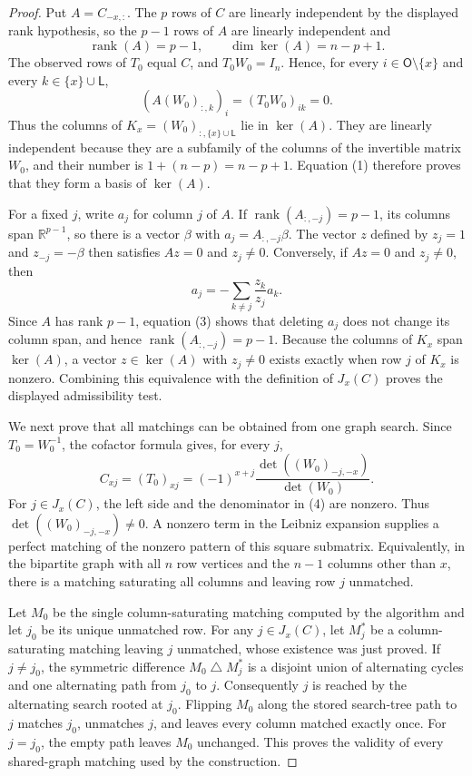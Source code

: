 \documentclass{article}
\begin{document}
\begin{proof}
Put \(A=C_{-x,:}\). The \(p\) rows of \(C\) are linearly independent by the displayed rank hypothesis, so the \(p-1\) rows of \(A\) are linearly independent and
\[
 \operatorname{rank}(A)=p-1,
 \qquad
 \dim\ker(A)=n-p+1. \tag{1}
\]
The observed rows of \(T_0\) equal \(C\), and \(T_0W_0=I_n\). Hence, for every \(i\in\mathsf O\setminus\{x\}\) and every \(k\in\{x\}\cup\mathsf L\),
\[
 (A(W_0)_{:,k})_i=(T_0W_0)_{ik}=0. \tag{2}
\]
Thus the columns of \(K_x=(W_0)_{:,\{x\}\cup\mathsf L}\) lie in \(\ker(A)\). They are linearly independent because they are a subfamily of the columns of the invertible matrix \(W_0\), and their number is \(1+(n-p)=n-p+1\). Equation (1) therefore proves that they form a basis of \(\ker(A)\).

For a fixed \(j\), write \(a_j\) for column \(j\) of \(A\). If \(\operatorname{rank}(A_{:,-j})=p-1\), its columns span \(\mathbb R^{p-1}\), so there is a vector \(\beta\) with \(a_j=A_{:,-j}\beta\). The vector \(z\) defined by \(z_j=1\) and \(z_{-j}=-\beta\) then satisfies \(Az=0\) and \(z_j\ne0\). Conversely, if \(Az=0\) and \(z_j\ne0\), then
\[
 a_j=-\sum_{k\ne j}\frac{z_k}{z_j}a_k. \tag{3}
\]
Since \(A\) has rank \(p-1\), equation (3) shows that deleting \(a_j\) does not change its column span, and hence \(\operatorname{rank}(A_{:,-j})=p-1\). Because the columns of \(K_x\) span \(\ker(A)\), a vector \(z\in\ker(A)\) with \(z_j\ne0\) exists exactly when row \(j\) of \(K_x\) is nonzero. Combining this equivalence with the definition of \(J_x(C)\) proves the displayed admissibility test.

We next prove that all matchings can be obtained from one graph search. Since \(T_0=W_0^{-1}\), the cofactor formula gives, for every \(j\),
\[
 C_{xj}=(T_0)_{xj}
 =(-1)^{x+j}\frac{\det((W_0)_{-j,-x})}{\det(W_0)}. \tag{4}
\]
For \(j\in J_x(C)\), the left side and the denominator in (4) are nonzero. Thus \(\det((W_0)_{-j,-x})\ne0\). A nonzero term in the Leibniz expansion supplies a perfect matching of the nonzero pattern of this square submatrix. Equivalently, in the bipartite graph with all \(n\) row vertices and the \(n-1\) columns other than \(x\), there is a matching saturating all columns and leaving row \(j\) unmatched.

Let \(M_0\) be the single column-saturating matching computed by the algorithm and let \(j_0\) be its unique unmatched row. For any \(j\in J_x(C)\), let \(M_j^*\) be a column-saturating matching leaving \(j\) unmatched, whose existence was just proved. If \(j\ne j_0\), the symmetric difference \(M_0\mathbin\triangle M_j^*\) is a disjoint union of alternating cycles and one alternating path from \(j_0\) to \(j\). Consequently \(j\) is reached by the alternating search rooted at \(j_0\). Flipping \(M_0\) along the stored search-tree path to \(j\) matches \(j_0\), unmatches \(j\), and leaves every column matched exactly once. For \(j=j_0\), the empty path leaves \(M_0\) unchanged. This proves the validity of every shared-graph matching used by the construction.


\end{proof}
\end{document}
